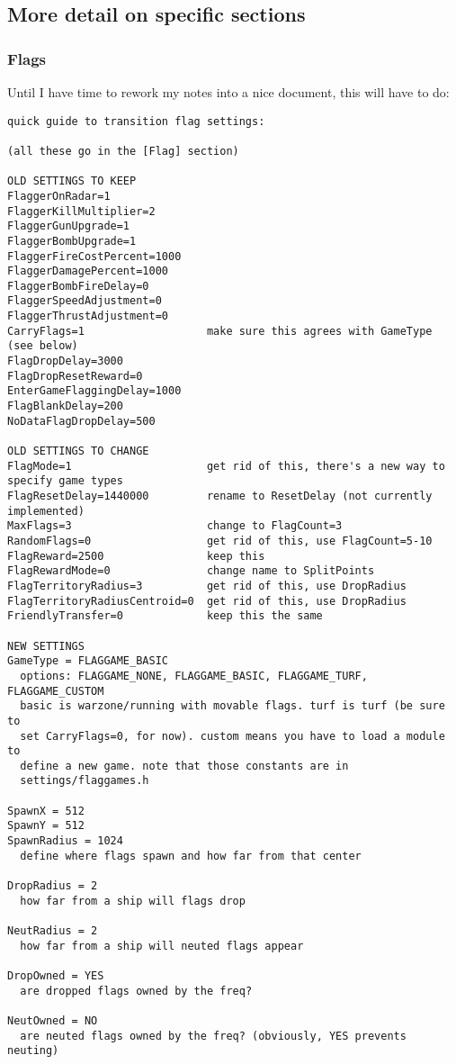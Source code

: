 \documentclass{article}
\begin{document}


\subsection{More detail on specific sections}

\subsubsection{Flags}

Until I have time to rework my notes into a nice document, this will
have to do:

\begin{verbatim}
quick guide to transition flag settings:

(all these go in the [Flag] section)

OLD SETTINGS TO KEEP
FlaggerOnRadar=1
FlaggerKillMultiplier=2
FlaggerGunUpgrade=1
FlaggerBombUpgrade=1
FlaggerFireCostPercent=1000
FlaggerDamagePercent=1000
FlaggerBombFireDelay=0
FlaggerSpeedAdjustment=0
FlaggerThrustAdjustment=0
CarryFlags=1                   make sure this agrees with GameType (see below)
FlagDropDelay=3000
FlagDropResetReward=0
EnterGameFlaggingDelay=1000
FlagBlankDelay=200
NoDataFlagDropDelay=500

OLD SETTINGS TO CHANGE
FlagMode=1                     get rid of this, there's a new way to specify game types
FlagResetDelay=1440000         rename to ResetDelay (not currently implemented)
MaxFlags=3                     change to FlagCount=3
RandomFlags=0                  get rid of this, use FlagCount=5-10
FlagReward=2500                keep this
FlagRewardMode=0               change name to SplitPoints
FlagTerritoryRadius=3          get rid of this, use DropRadius
FlagTerritoryRadiusCentroid=0  get rid of this, use DropRadius
FriendlyTransfer=0             keep this the same

NEW SETTINGS
GameType = FLAGGAME_BASIC
  options: FLAGGAME_NONE, FLAGGAME_BASIC, FLAGGAME_TURF, FLAGGAME_CUSTOM
  basic is warzone/running with movable flags. turf is turf (be sure to
  set CarryFlags=0, for now). custom means you have to load a module to
  define a new game. note that those constants are in
  settings/flaggames.h

SpawnX = 512
SpawnY = 512
SpawnRadius = 1024
  define where flags spawn and how far from that center

DropRadius = 2
  how far from a ship will flags drop

NeutRadius = 2
  how far from a ship will neuted flags appear

DropOwned = YES
  are dropped flags owned by the freq?

NeutOwned = NO
  are neuted flags owned by the freq? (obviously, YES prevents neuting)
\end{verbatim}
\end{document}
